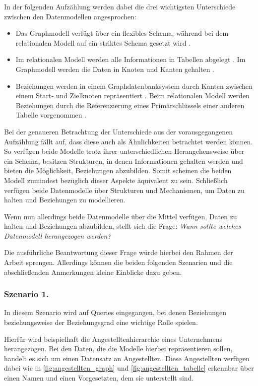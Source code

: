 In der folgenden Aufzählung werden dabei die drei wichtigsten Unterschiede zwischen den Datenmodellen angesprochen:
\begin{itemize}
    \item Das Graphmodell verfügt über ein flexibles Schema, während bei dem relationalen Modell auf ein striktes Schema gesetzt wird \cite{gdbms,rdbms_book}.
    \item Im relationalen Modell werden alle Informationen in Tabellen abgelegt \cite{rdbms_book}. Im Graphmodell werden die Daten in Knoten und Kanten gehalten \cite{gdbms}. 
    \item Beziehungen werden in einem Graphdatenbanksystem durch Kanten zwischen einem Start- und Zielknoten repräsentiert \cite{gdbms}. Beim relationalen Modell werden Beziehungen durch die Referenzierung eines Primärschlüssels einer anderen Tabelle vorgenommen \cite{rdbms_book}. 
\end{itemize}
Bei der genaueren Betrachtung der Unterschiede aus der vorausgegangenen Aufzählung fällt auf, dass diese auch als Ähnlichkeiten betrachtet werden können. So verfügen beide Modelle trotz ihrer unterschiedlichen Herangehensweise über ein Schema, besitzen Strukturen, in denen Informationen gehalten werden und bieten die Möglichkeit, Beziehungen abzubilden. Somit scheinen die beiden Modell zumindest bezüglich dieser Aspekte äquivalent zu sein. Schließlich verfügen beide Datenmodelle über Strukturen und Mechanismen, um Daten zu halten und Beziehungen zu modellieren. 

Wenn nun allerdings beide Datenmodelle über die Mittel verfügen, Daten zu halten und Beziehungen abzubilden, stellt sich die Frage: \textit{Wann sollte welches Datenmodell herangezogen werden?}

Die ausführliche Beantwortung dieser Frage würde hierbei den Rahmen der Arbeit sprengen. Allerdings können die beiden folgenden Szenarien und die abschließenden Anmerkungen kleine Einblicke dazu geben. 

\subsubsection{Szenario 1.}
In diesem Szenario wird auf Queries eingegangen, bei denen Beziehungen beziehungsweise der Beziehungsgrad eine wichtige Rolle spielen. 

Hierfür wird beispielhaft die Angestelltenhierarchie eines Unternehmens herangezogen. Bei den Daten, die die Modelle hierbei repräsentieren sollen, handelt es sich um einen Datensatz an Angestellten. Diese Angestellten verfügen dabei wie in \autoref{fig:angestellten_graph} und \autoref{fig:angestellten_tabelle} erkennbar über einen Namen und einen Vorgesetzten, dem sie unterstellt sind. 

